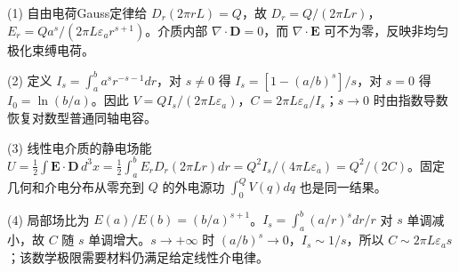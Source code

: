 (1) 自由电荷Gauss定律给 \(D_r(2\pi rL)=Q\)，故 \(D_r=Q/(2\pi Lr)\)，\(E_r=Q a^s/(2\pi L\varepsilon_a r^{s+1})\)。介质内部 \(\nabla\cdot\mathbf D=0\)，而 \(\nabla\cdot\mathbf E\) 可不为零，反映非均匀极化束缚电荷。

(2) 定义 \(I_s=\int_a^b a^sr^{-s-1}dr\)，对 \(s\ne0\) 得 \(I_s=[1-(a/b)^s]/s\)，对 \(s=0\) 得 \(I_0=\ln(b/a)\)。因此 \(V=QI_s/(2\pi L\varepsilon_a)\)，\(\boxed{C=2\pi L\varepsilon_a/I_s}\)；\(s\to0\) 时由指数导数恢复对数型普通同轴电容。

(3) 线性电介质的静电场能 \(U=\tfrac12\int\mathbf E\cdot\mathbf D\,d^3x=\tfrac12\int_a^b E_rD_r(2\pi Lr)dr=Q^2I_s/(4\pi L\varepsilon_a)=Q^2/(2C)\)。固定几何和介电分布从零充到 \(Q\) 的外电源功 \(\int_0^Q V(q)dq\) 也是同一结果。

(4) 局部场比为 \(E(a)/E(b)=(b/a)^{s+1}\)。\(I_s=\int_a^b (a/r)^s dr/r\) 对 \(s\) 单调减小，故 \(C\) 随 \(s\) 单调增大。\(s\to+\infty\) 时 \((a/b)^s\to0\)，\(I_s\sim1/s\)，所以 \(C\sim2\pi L\varepsilon_a s\)；该数学极限需要材料仍满足给定线性介电律。
